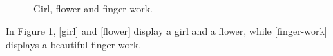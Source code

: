 \documentclass[a4paper]{article}
\begin{document}
\begin{figure}[!htb]
    \centering
    \hfill
    \\
    \caption{Girl, flower and finger work.}
    \label{girl_flower_finger}
\end{figure}
%
In Figure \ref{girl_flower_finger}, \ref{girl}
and \ref{flower} display a girl and a flower,
while \ref{finger-work} displays a beautiful finger
work.
\end{document}
